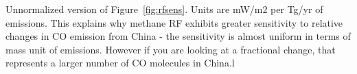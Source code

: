 Unnormalized version of Figure~\ref{fig:rfsens}. Units are mW/m2 per Tg/yr of emissions. This explains why methane RF exhibits greater sensitivity to relative changes in CO emission from China - the sensitivity is almost uniform in terms of mass unit of emissions. However if you are looking at a fractional change, that represents a larger number of CO molecules in China.l